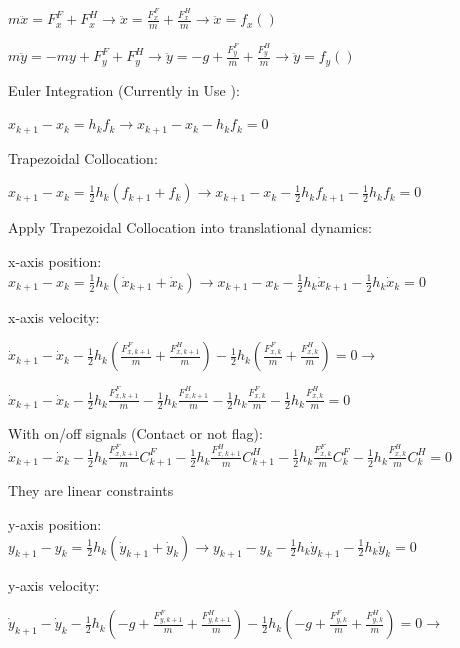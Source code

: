 \documentclass[a4paper,10pt]{article}
\begin{document}
$m\ddot{x} = F^F_x + F^H_x \rightarrow \ddot{x} = \frac{F^F_x}{m} + \frac{F^H_x}{m} \rightarrow \ddot{x} = f_x()$
\vspace{2mm}

$m\ddot{y} = -my + F^F_y + F^H_y \rightarrow \ddot{y} = -g + \frac{F^F_y}{m} + \frac{F^H_y}{m} \rightarrow \ddot{y} = f_y()$

\vspace{2mm}

Euler Integration (Currently in Use ):

$x_{k+1}-x_k =h_kf_k \rightarrow x_{k+1}-x_k-h_kf_k = 0$

Trapezoidal Collocation:

$x_{k+1}-x_k = \frac{1}{2}h_k(f_{k+1}+f_k) \rightarrow x_{k+1}-x_k-\frac{1}{2}h_kf_{k+1}-\frac{1}{2}h_kf_k = 0$

\vspace{2mm}

Apply Trapezoidal Collocation into translational dynamics:

x-axis position: $x_{k+1}-x_k=\frac{1}{2}h_k(\dot{x}_{k+1}+\dot{x}_k) \rightarrow x_{k+1}-x_k-\frac{1}{2}h_k\dot{x}_{k+1}-\frac{1}{2}h_k\dot{x}_k = 0$

x-axis velocity: 

$\dot{x}_{k+1}-\dot{x}_k-\frac{1}{2}h_k(\frac{F^F_{x,k+1}}{m}+\frac{F^H_{x,k+1}}{m})-\frac{1}{2}h_k(\frac{F^F_{x,k}}{m}+\frac{F^H_{x,k}}{m}) = 0 \rightarrow$

$\dot{x}_{k+1}-\dot{x}_k-\frac{1}{2}h_k\frac{F^F_{x,k+1}}{m}-\frac{1}{2}h_k\frac{F^H_{x,k+1}}{m}-\frac{1}{2}h_k\frac{F^F_{x,k}}{m}-\frac{1}{2}h_k\frac{F^H_{x,k}}{m} = 0$

With on/off signals (Contact or not flag):
$\dot{x}_{k+1}-\dot{x}_k-\frac{1}{2}h_k\frac{F^F_{x,k+1}}{m}C^F_{k+1}-\frac{1}{2}h_k\frac{F^H_{x,k+1}}{m}C^H_{k+1}-\frac{1}{2}h_k\frac{F^F_{x,k}}{m}C^F_{k}-\frac{1}{2}h_k\frac{F^H_{x,k}}{m}C^H_{k} = 0$

They are linear constraints

\vspace{3mm}

y-axis position: $y_{k+1}-y_k = \frac{1}{2}h_k(\dot{y}_{k+1}+\dot{y}_k) \rightarrow y_{k+1}-y_k-\frac{1}{2}h_k\dot{y}_{k+1}-\frac{1}{2}h_k\dot{y}_k = 0$

y-axis velocity:

$\dot{y}_{k+1}-\dot{y}_k-\frac{1}{2}h_k(-g+\frac{F^F_{y,k+1}}{m}+\frac{F^H_{y,k+1}}{m})-\frac{1}{2}h_k(-g+\frac{F^F_{y,k}}{m}+\frac{F^H_{y,k}}{m}) = 0 \rightarrow $
\end{document}
